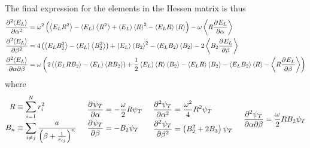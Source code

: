 \documentclass[a4paper, hidelinks, 10pt]{article}\usepackage[utf8]{inputenc}
\newcommand{\prtl}{\mathrm{\partial}} %
\newcommand{\ecp}[1]{\left< {#1} \right>} %
\newcommand{\suml}[2]{\sum\limits_{#1=1}^{#2}}
\begin{document}
    The final expression for the elements in the Hessen matrix is thus
        \begin{equation}
            \begin{aligned}
                \prd{\alpha}[\ecp{E_L}][2] &= \omega^2 \left(\ecp{E_LR^2} -
                \ecp{E_L}\ecp{R^2} + \ecp{E_L}\ecp{R}^2 -
                \ecp{E_LR}\ecp{R}\right) - \omega\ecp{R\prd{\alpha}[E_L]} \\
                \prd{\beta}[\ecp{E_L}][2] &= 4\left(\ecp{E_LB^2_2} -
                \ecp{E_L}\ecp{B^2_2}\right) + \ecp{E_L}\ecp{B_2}^2 -
                \ecp{E_LB_2}\ecp{B_2} - 2\ecp{B_2\prd{\beta}[E_L]} \\
                \mixprd{\ecp{E_L}}[\alpha][\beta] &=
                \omega\left(2\left(\ecp{E_LRB_2} - \ecp{E_L}\ecp{RB_2}\right) +
                \frac{1}{2}\ecp{E_L}\ecp{R}\ecp{B_2} - \ecp{E_LR}\ecp{B_2} -
                \ecp{E_LB_2}\ecp{R} - \ecp{R\prd{\beta}[E_L]}\right)
            \end{aligned}
            \label{eq:HessenElemFin}
        \end{equation}
    where 
        \begin{equation}
            \begin{aligned}
                R &\equiv \suml{i}{N}r^2_i \\ 
                B_n &\equiv \sum\limits_{i\neq j} \frac{a}{\left(\beta +
                \frac{1}{r_{ij}}\right)^n} 
            \end{aligned}
            \hspace{0.5cm}
            \begin{aligned}
                \prd{\alpha}[\psi_T] &= -\frac{\omega}{2}R\psi_T  \\
                \prd{\beta}[\psi_T] &= -B_2\psi_T 
            \end{aligned}
            \hspace{0.5cm}
            \begin{aligned}
                \prd{\alpha}[\psi_T][2] &= \frac{\omega^2}{4}R^2\psi_T \\
                \prd{\beta}[\psi_T][2] &= \left(B^2_2 + 2B_3\right)\psi_T
            \end{aligned}
            \hspace{0.5cm}
            \begin{aligned}
                \frac{\prtl^2\psi_T}{\prtl\alpha\prtl\beta} =
                \frac{\omega}{2}RB_2\psi_T
            \end{aligned}
            \label{eq:RBdef}
        \end{equation}
\end{document}
